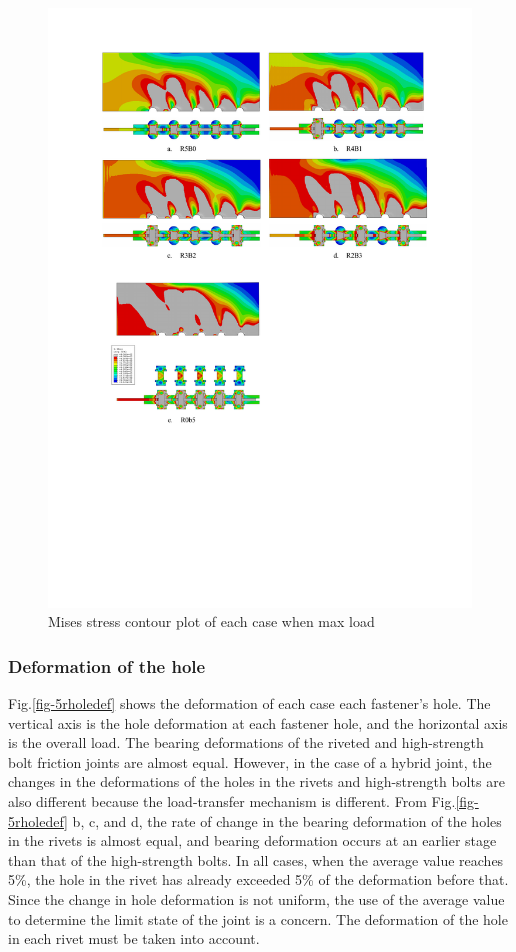 \begin{figure}
    \centering
    \includegraphics[width=1\linewidth]{imgs//ch4/fig-5rulscount.pdf}
    \caption{Mises stress contour plot of each case when max load}
    \label{fig-5rulscount}
\end{figure}

\subsubsection{Deformation of the hole}


Fig.\ref{fig-5rholedef} shows the deformation of each case each fastener's hole. The vertical axis is the hole deformation at each fastener hole, and the horizontal axis is the overall load. The bearing deformations of the riveted and high-strength bolt friction joints are almost equal. However, in the case of a hybrid joint, the changes in the deformations of the holes in the rivets and high-strength bolts are also different because the load-transfer mechanism is different. From Fig.\ref{fig-5rholedef} b, c, and d, the rate of change in the bearing deformation of the holes in the rivets is almost equal, and bearing deformation occurs at an earlier stage than that of the high-strength bolts. In all cases, when the average value reaches 5\%, the hole in the rivet has already exceeded 5\% of the deformation before that. Since the change in hole deformation is not uniform, the use of the average value to determine the limit state of the joint is a concern. The deformation of the hole in each rivet must be taken into account.

